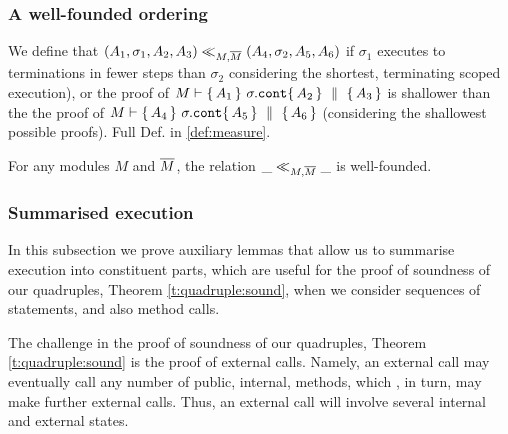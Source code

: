 \subsubsection{A well-founded ordering}
\label{sect:prove:wellfounded}

We define that $(A_1,\sigma_1,A_2, A_3) \ll_{M,\overline{M}}  (A_4,\sigma_2,A_5, A_6)$ if $\sigma_1$ executes to terminations in fewer steps than $\sigma_2$ considering the shortest, terminating scoped execution), or  the proof of $M \vdash  \{\, A_1 \, \}\ \sigma.\mbox{\normalfont{\texttt{cont}}} \{\, A_2 \, \} \, \,\parallel\,\, \{\, A_3 \, \}  $
is shallower than the the proof of  $M \vdash  \{\, A_4 \, \}\ \sigma.\mbox{\normalfont{\texttt{cont}}} \{\, A_5 \, \} \, \,\parallel\,\, \{\, A_6 \, \}  $ (considering the shallowest possible proofs). Full Def. in \ref{def:measure}.

 

 


\begin{auxLemma}
\label{lemma:normal:two}
For any modules $M$ and $\overline{M}$,  the relation $\_ \ll_{M,\overline{M}}  \_$ is well-founded.
\end{auxLemma}

\subsubsection{Summarised  execution} 
\label{sect:termExecs}

In this subsection we prove auxiliary lemmas that allow us to summarise execution into  constituent parts, which are useful for the proof of soundness of our quadruples, Theorem \ref{t:quadruple:sound}, when we consider sequences of statements, and also method calls.

 


\label{sect:termExecs}

The challenge in the proof of soundness of our quadruples, Theorem \ref{t:quadruple:sound} is the proof of external calls. 
Namely, an external call may eventually call any number of public, internal, methods, which , in turn, may make further external calls.
Thus, an external call will involve several internal and external states.

